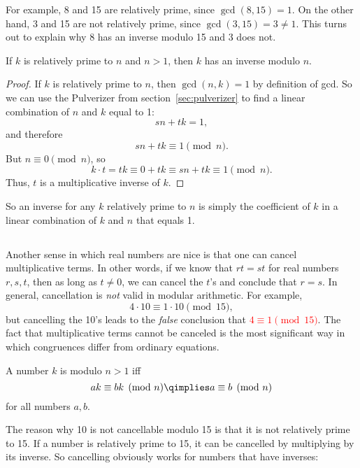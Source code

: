 For example, 8 and 15 are relatively prime, since $\gcd(8, 15) = 1$.
On the other hand, 3 and 15 are not relatively prime, since $\gcd(3,
15) = 3 \neq 1$.  This turns out to explain why 8 has an inverse
modulo 15 and 3 does not.

\begin{lemma}\label{lem:inverse-arb} If $k$ is relatively prime to
$n$ and $n>1$, then $k$ has an inverse modulo $n$.
\end{lemma}

\begin{proof}
If $k$ is relatively prime to $n$, then $\gcd(n, k) = 1$ by definition
of gcd.  So we can use the Pulverizer from section~\ref{sec:pulverizer} to find
a linear combination of $n$ and $k$ equal to 1:
\[
s n + t k = 1,
\]
and therefore
\[
s n + t k \equiv 1 \pmod{n}.
\]
But $n \equiv 0 \pmod{n}$, so
\[
k \cdot t = tk \equiv 0 + tk \equiv sn +tk \equiv 1 \pmod{n}.
\]
Thus, $t$ is a multiplicative inverse of $k$.
\end{proof}

So an inverse for any $k$ relatively prime to $n$ is simply the
coefficient of $k$ in a linear combination of $k$ and $n$ that equals
1.

\subsection{}

Another sense in which real numbers are nice is that one can cancel
multiplicative terms.  In other words, if we know that $r t = s t$ for
real numbers $r,s,t$, then as long as $t \neq 0$, we can cancel the
$t$'s and conclude that $r = s$.  In general, cancellation is
\emph{not} valid in modular arithmetic.  For example,
\[
4 \cdot 10 \equiv 1 \cdot 10 \pmod{15},
\]
but cancelling the 10's leads to the \emph{false} conclusion that
\textcolor{red}{$4 \equiv 1 \pmod{15}$}.  The fact that multiplicative
terms cannot be canceled is the most significant way in which
congruences differ from ordinary equations.  

\begin{definition}
A number $k$ is  modulo $n >1$ iff
\[
a k \equiv b k \pmod{n} \qimplies a \equiv b \pmod{n}
\]
for all numbers $a,b$.
\end{definition}

The reason why 10 is not cancellable modulo 15 is that it is not
relatively prime to 15.  If a number is relatively prime to 15, it can
be cancelled by multiplying by its inverse.  So cancelling obviously
works for numbers that have inverses:

